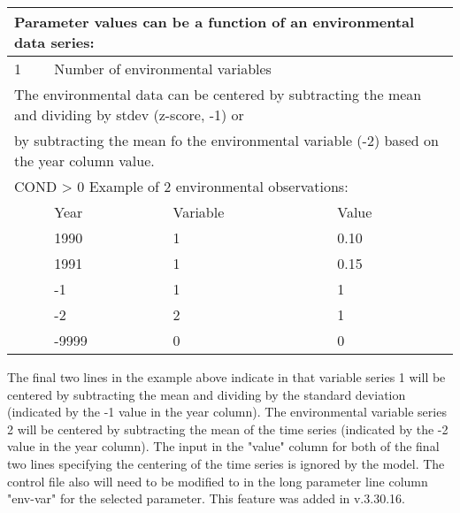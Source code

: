 \begin{center}
	\begin{tabular}{p{1cm} p{3cm} p{3cm} p{7.5cm}}
		\multicolumn{4}{l}{Parameter values can be a function of an environmental data series: }\\
		\hline
		1 & \multicolumn{3}{l}{Number of environmental variables}\Tstrut\Bstrut\\
		\multicolumn{4}{l}{ The environmental data can be centered by subtracting the mean and dividing by stdev (z-score, -1) or }\\
		\multicolumn{4}{l}{ by subtracting the mean fo the environmental variable (-2) based on the year column value. }\\
		\hline
		\multicolumn{4}{l}{COND > 0  Example of 2 environmental observations:} \Tstrut\\
		  & Year & Variable & Value \Bstrut\\
		\hline
		  & 1990 & 1 & 0.10 \Tstrut\\
		  & 1991 & 1 & 0.15 \\
		  & -1   & 1 & 1 \\
		  & -2   & 2 & 1 \\
		  & -9999 & 0 & 0 \Bstrut\\
		\hline
	\end{tabular}
\end{center}

The final two lines in the example above indicate in that variable series 1 will be centered by subtracting the mean and dividing by the standard deviation (indicated by the -1 value in the year column). The environmental variable series 2 will be centered by subtracting the mean of the time series (indicated by the -2 value in the year column).  The input in the "value" column for both of the final two lines specifying the centering of the time series is ignored by the model. The control file also will need to be modified to in the long parameter line column "env-var" for the selected parameter. This feature was added in v.3.30.16.


